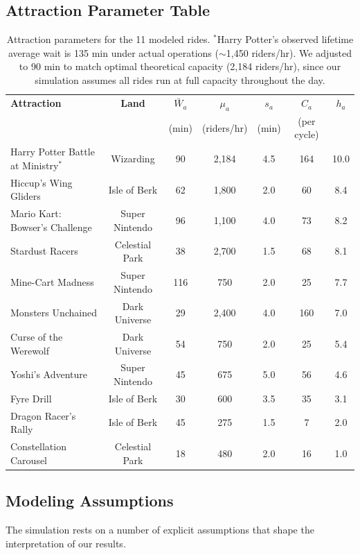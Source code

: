 \documentclass[11pt]{article}
\begin{document}
\subsection{Attraction Parameter Table}

\begin{table}[H]
\centering
\small
\begin{tabular}{lcccccc}
\toprule
\textbf{Attraction} & \textbf{Land} & $\bar{W}_a$ & $\mu_a$ & $s_a$ & $C_a$ & $h_a$ \\
 & & (min) & (riders/hr) & (min) & (per cycle) & \\
\midrule
Harry Potter Battle at Ministry$^*$ & Wizarding & 90 & 2,184 & 4.5 & 164 & 10.0 \\
Hiccup's Wing Gliders & Isle of Berk & 62 & 1,800 & 2.0 & 60 & 8.4 \\
Mario Kart: Bowser's Challenge & Super Nintendo & 96 & 1,100 & 4.0 & 73 & 8.2 \\
Stardust Racers & Celestial Park & 38 & 2,700 & 1.5 & 68 & 8.1 \\
Mine-Cart Madness & Super Nintendo & 116 & 750 & 2.0 & 25 & 7.7 \\
Monsters Unchained & Dark Universe & 29 & 2,400 & 4.0 & 160 & 7.0 \\
Curse of the Werewolf & Dark Universe & 54 & 750 & 2.0 & 25 & 5.4 \\
Yoshi's Adventure & Super Nintendo & 45 & 675 & 5.0 & 56 & 4.6 \\
Fyre Drill & Isle of Berk & 30 & 600 & 3.5 & 35 & 3.1 \\
Dragon Racer's Rally & Isle of Berk & 45 & 275 & 1.5 & 7 & 2.0 \\
Constellation Carousel & Celestial Park & 18 & 480 & 2.0 & 16 & 1.0 \\
\bottomrule
\end{tabular}
\caption{Attraction parameters for the 11 modeled rides. $^*$Harry Potter's observed lifetime average wait is 135 min under actual operations ($\sim$1,450 riders/hr). We adjusted to 90 min to match optimal theoretical capacity (2,184 riders/hr), since our simulation assumes all rides run at full capacity throughout the day.}
\end{table}

\subsection{Modeling Assumptions}

The simulation rests on a number of explicit assumptions that shape the interpretation of our results.
\end{document}
